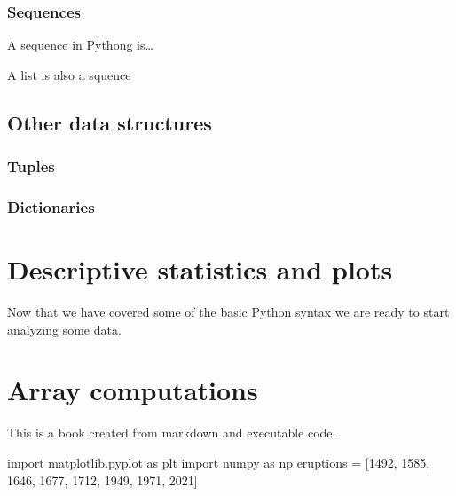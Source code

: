 \documentclass[
  letterpaper,
  DIV=11,
  numbers=noendperiod]{scrreprt}
\newenvironment{Shaded}{\begin{snugshade}}{\end{snugshade}}
\newcommand{\DecValTok}[1]{\textcolor[rgb]{0.68,0.00,0.00}{#1}}
\newcommand{\ImportTok}[1]{\textcolor[rgb]{0.00,0.46,0.62}{#1}}
\newcommand{\NormalTok}[1]{\textcolor[rgb]{0.00,0.23,0.31}{#1}}
\newcommand{\OperatorTok}[1]{\textcolor[rgb]{0.37,0.37,0.37}{#1}}
\begin{document}
\subsection{Sequences}\label{sequences}

A sequence in Pythong is\ldots{}

A list is also a squence

\section{Other data structures}\label{other-data-structures}

\subsection{Tuples}\label{tuples}

\subsection{Dictionaries}\label{dictionaries}


\chapter{Descriptive statistics and
plots}\label{descriptive-statistics-and-plots}

Now that we have covered some of the basic Python syntax we are ready to
start analyzing some data.


\chapter{Array computations}\label{array-computations}

This is a book created from markdown and executable code.

\begin{Shaded}
\begin{Highlighting}[]
\ImportTok{import}\NormalTok{ matplotlib.pyplot }\ImportTok{as}\NormalTok{ plt}
\ImportTok{import}\NormalTok{ numpy }\ImportTok{as}\NormalTok{ np}
\NormalTok{eruptions }\OperatorTok{=}\NormalTok{ [}\DecValTok{1492}\NormalTok{, }\DecValTok{1585}\NormalTok{, }\DecValTok{1646}\NormalTok{, }\DecValTok{1677}\NormalTok{, }\DecValTok{1712}\NormalTok{, }\DecValTok{1949}\NormalTok{, }\DecValTok{1971}\NormalTok{, }\DecValTok{2021}\NormalTok{]}
\end{Highlighting}
\end{Shaded}
\end{document}
